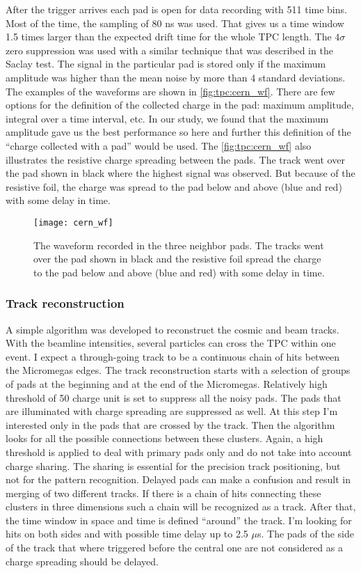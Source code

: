 \documentclass[../main.tex]{subfiles}
\begin{document}
After the trigger arrives each pad is open for data recording with 511 time bins. Most of the time, the sampling of 80 ns was used. That gives us a time window 1.5 times larger than the expected drift time for the whole TPC length. The $4\sigma$ zero suppression was used with a similar technique that was described in the Saclay test. The signal in the particular pad is stored only if the maximum amplitude was higher than the mean noise by more than 4 standard deviations. The examples of the waveforms are shown in \autoref{fig:tpc:cern_wf}. There are few options for the definition of the collected charge in the pad: maximum amplitude, integral over a time interval, etc. In our study, we found that the maximum amplitude gave us the best performance so here and further this definition of the ``charge collected with a pad'' would be used. The \autoref{fig:tpc:cern_wf} also illustrates the resistive charge spreading between the pads. The track went over the pad shown in black where the highest signal was observed. But because of the resistive foil, the charge was spread to the pad below and above (blue and red) with some delay in time.

\begin{figure}[!ht]
   \centering
   \texttt{[image: cern\_wf]}
   \caption{The waveform recorded in the three neighbor pads. The tracks went over the pad shown in black and the resistive foil spread the charge to the pad below and above (blue and red) with some delay in time.}
   \label{fig:tpc:cern_wf}
 \end{figure}

\subsubsection{Track reconstruction}
A simple algorithm was developed to reconstruct the cosmic and beam tracks. With the beamline intensities, several particles can cross the TPC within one event. I expect a through-going track to be a continuous chain of hits between the Micromegas edges. The track reconstruction starts with a selection of groups of pads at the beginning and at the end of the Micromegas. Relatively high threshold of 50 charge unit is set to suppress all the noisy pads. The pads that are illuminated with charge spreading are suppressed as well. At this step I'm interested only in the pads that are crossed by the track. Then the algorithm looks for all the possible connections between these clusters. Again, a high threshold is applied to deal with primary pads only and do not take into account charge sharing. The sharing is essential for the precision track positioning, but not for the pattern recognition. Delayed pads can make a confusion and result in merging of two different tracks. If there is a chain of hits connecting these clusters in three dimensions such a chain will be recognized as a track. After that, the time window in space and time is defined ``around'' the track. I'm looking for hits on both sides and with possible time delay up to 2.5 $\mu$s. The pads of the side of the track that where triggered before the central one are not considered as a charge spreading should be delayed.
\end{document}
